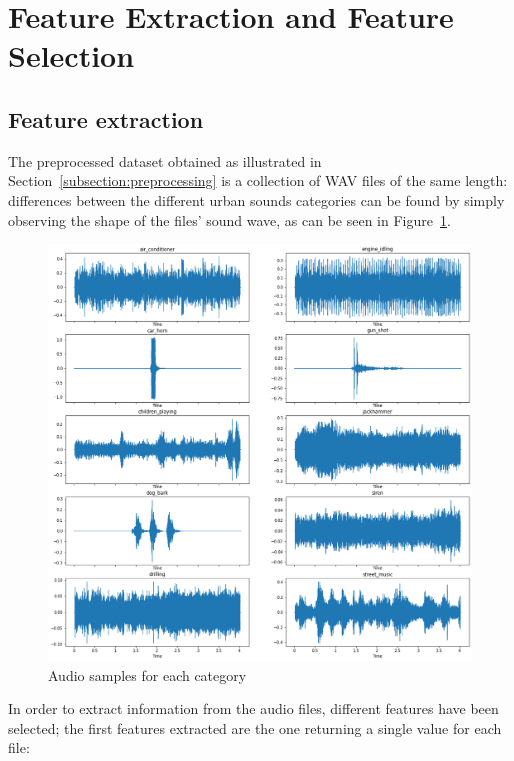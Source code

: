 \documentclass[oneside,openany]{article}
\begin{document}
    \section{Feature Extraction and Feature Selection}
    \label{section:features}
    
    \subsection{Feature extraction}
    \label{subsection:feature_extraction}
    The preprocessed dataset obtained as illustrated in Section~\ref{subsection:preprocessing} is a collection of WAV files of the same length: differences between the different urban sounds categories can be found by simply observing the shape of the files' sound wave, as can be seen in Figure~\ref{fig:audio}.\\
    \begin{figure}[h]
    \includegraphics[width=\columnwidth]{audio.png}
    \caption{Audio samples for each category}
    \label{fig:audio}
    \end{figure}
    In order to extract information from the audio files, different features have been selected; the first features extracted are the one returning a single value for each file:
\end{document}
